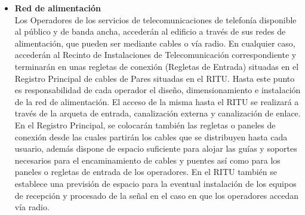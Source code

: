 \begin{itemize}
	\item \textbf{Red de alimentación}\\
	Los Operadores de los servicios de telecomunicaciones de telefonía disponible al público y de
	banda ancha, accederán al edificio a través de sus redes de alimentación, que pueden ser
	mediante cables o vía radio. En cualquier caso, accederán al Recinto de Instalaciones de
	Telecomunicación correspondiente y terminarán en unas regletas de conexión (Regletas de
	Entrada) situadas en el Registro Principal de cables de Pares situadas en el RITU.
	Hasta este punto es responsabilidad de cada operador el diseño, dimensionamiento e instalación
	de la red de alimentación. El acceso de la misma hasta el RITU se realizará a través de la arqueta
	de entrada, canalización externa y canalización de enlace.
	En el Registro Principal, se colocarán también las regletas o paneles de conexión desde las
	cuales partirán los cables que se distribuyen hasta cada usuario, además dispone de espacio
	suficiente para alojar las guías y soportes necesarios para el encaminamiento de cables y puentes
	así como para los paneles o regletas de entrada de los operadores.
	En el RITU también se establece una previsión de espacio para la eventual instalación de los equipos de
	recepción y procesado de la señal en el caso en que los operadores accedan vía radio.
	
\end{itemize}

